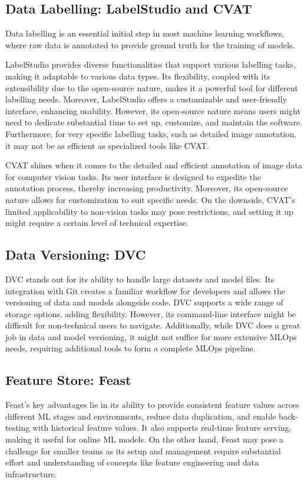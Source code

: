 \subsection{Data Labelling: LabelStudio and CVAT \label{labelling}}
Data labelling is an essential initial step in most machine learning workflows, where raw data is annotated to provide ground truth for the training of models.

LabelStudio provides diverse functionalities that support various labelling tasks, making it adaptable to various data types. Its flexibility, coupled with its extensibility due to the open-source nature, makes it a powerful tool for different labelling needs. Moreover, LabelStudio offers a customizable and user-friendly interface, enhancing usability. However, its open-source nature means users might need to dedicate substantial time to set up, customize, and maintain the software. Furthermore, for very specific labelling tasks, such as detailed image annotation, it may not be as efficient as specialized tools like CVAT.

CVAT shines when it comes to the detailed and efficient annotation of image data for computer vision tasks. Its user interface is designed to expedite the annotation process, thereby increasing productivity. Moreover, its open-source nature allows for customization to suit specific needs. On the downside, CVAT's limited applicability to non-vision tasks may pose restrictions, and setting it up might require a certain level of technical expertise.

\subsection{Data Versioning: DVC \label{data-versioning}}
DVC stands out for its ability to handle large datasets and model files. Its integration with Git creates a familiar workflow for developers and allows the versioning of data and models alongside code. DVC supports a wide range of storage options, adding flexibility. However, its command-line interface might be difficult for non-technical users to navigate. Additionally, while DVC does a great job in data and model versioning, it might not suffice for more extensive MLOps needs, requiring additional tools to form a complete MLOps pipeline.

\subsection{Feature Store: Feast \label{feature-store}}
Feast's key advantages lie in its ability to provide consistent feature values across different ML stages and environments, reduce data duplication, and enable back-testing with historical feature values. It also supports real-time feature serving, making it useful for online ML models. On the other hand, Feast may pose a challenge for smaller teams as its setup and management require substantial effort and understanding of concepts like feature engineering and data infrastructure.

